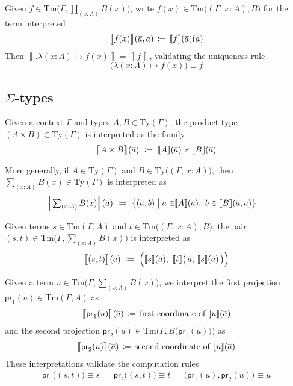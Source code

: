 \documentclass{article}
\theoremstyle{definition}
\renewcommand{\int}[1]{\mathopen{}\left\llbracket #1
    \right\rrbracket\mathclose{}}       %
\newcommand{\Pii}[2]{\textstyle\prod_{#1} #2}             %
\newcommand{\lam}[2]{\lambda #1 \mapsto #2}
\newcommand{\Sig}[2]{\textstyle\sum_{#1} #2}              %
\newcommand{\tproj}{\mathsf{pr}}
\newcommand{\Ty}{\mathrm{Ty}}
\newcommand{\Tm}{\mathrm{Tm}}
\newcommand{\defeq}{
	\mathrel{\mathrel{\mathop:}\mkern-1.2mu=}}	%
\newcommand{\tup}[1]{\overline{\smash{#1}\vphantom{a}}}
\newcommand{\sproj}{\pi}
\newcommand{\n}{%
}                %
\begin{document}
Given $f \in \Tm\big( \Gamma, \Pii{(x:A)}{B(x)} \big)$, write $f(x) \in \Tm \big( (\Gamma,\, x:A), B \big)$ for the term interpreted $$\int{\big.f(x)}\n(\tup{a},a)\, \defeq\, \int{f}\n(\tup{a})(a)$$
Then $\int{\big.\lam{(x:A)}{f(x)}} = \int{f}$, validating the uniqueness rule $$\big( \lam{(x:A)}{f(x)} \big) \equiv f$$


\subsection{\texorpdfstring{$\Sigma$}{Sigma}-types}

Given a context $\Gamma$ and types $A, B \in \Ty(\Gamma)$, the product type $(A \times B) \in \Ty(\Gamma)$ is interpreted as the family
$$\int{\big.A \times B}\n(\tup{a})\ \defeq\ \int{A}\n(\tup{a}) \times \int{B}\n(\tup{a})$$

More generally, if $A \in \Ty(\Gamma)$ and $B \in \Ty \big( (\Gamma,\, x:A) \big)$, then $\Sig{(x:A)}{B(x)}\in \Ty(\Gamma)$ is interpreted as
\begin{align*}
    \int{\Sig{(x:A)}{B(x)}}(\tup{a})\ \defeq\ \big\{ (a,b) \mathrel{\big|} a \in &\int{A}\n(\tup{a}),\ b \in \int{B}\n(\tup{a},a) \big\}
\end{align*}

Given terms $s \in \Tm(\Gamma, A)$ and $t \in \Tm \big( (\Gamma,\, x:A), B \big)$, the pair $(s,t) \in \Tm\Big( \Gamma, \Sig{(x:A)}{B(x)} \Big)$ is interpreted as
$$\int{\big.(s,t)}\n(\tup{a})\ \defeq\ \Big( \int{s}\n(\tup{a}),\ \int{t}\n\big(\, \tup{a},\,\int{s}\n(\tup{a}) \,\big) \Big)$$

Given a term $u \in \Tm\Big( \Gamma, \Sig{(x:A)}{B(x)} \Big)$, we interpret the first projection $\tproj_1(u) \in \Tm(\Gamma, A)$ as $$\int{\big.\tproj_1(u)}(\tup{a})\, \defeq\, \text{first coordinate of } \int{u}(\tup{a})$$%
and the second projection $\tproj_2(u) \in \Tm \Big( \Gamma, B \big( \tproj_1(u) \big) \Big)$ as $$\int{\big.\tproj_2(u)}(\tup{a})\, \defeq\, \text{second coordinate of } \int{u}(\tup{a})$$%
These interpretations validate the computation rules
\begin{align*}
    \tproj_1 \big( (s,t) \big) \equiv s & & \tproj_2 \big( (s,t) \big) \equiv t & & \big( \tproj_1(u), \tproj_2(u) \big) \equiv u
\end{align*}
\end{document}
